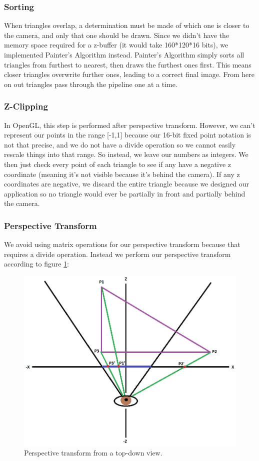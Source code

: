 \documentclass[onecolumn]{IEEEtran}
\begin{document}
\subsubsection{Sorting}
When triangles overlap, a determination must be made of which one is closer to the camera, and only that one should be drawn.  Since we didn’t have the memory space required for a z-buffer (it would take 160*120*16 bits), we implemented Painter’s Algorithm instead.  Painter’s Algorithm simply sorts all triangles from furthest to nearest, then draws the furthest ones first.  This means closer triangles overwrite further ones, leading to a correct final image.  From here on out triangles pass through the pipeline one at a time.

\subsubsection{Z-Clipping}
In OpenGL, this step is performed after perspective transform.   However, we can’t represent our points in the range [-1,1] because our 16-bit fixed point notation is not that precise, and we do not have a divide operation so we cannot easily rescale things into that range.  So instead, we leave our numbers as integers.  We then just check every point of each triangle to see if any have a negative z coordinate (meaning it’s not visible because it’s behind the camera).  If any z coordinates are negative, we discard the entire triangle because we designed our application so no triangle would ever be partially in front and partially behind the camera.

\subsubsection{Perspective Transform}
We avoid using matrix operations for our perspective transform because that requires a divide operation.  Instead we perform our perspective transform according to figure \ref{fig:perspectiveTransform}:

\begin{figure}[H]
	\centering
	\includegraphics[width=1.0\textwidth]{perspective.png}
	\caption{Perspective transform from a top-down view.}
	\label{fig:perspectiveTransform}
\end{figure}
\end{document}
